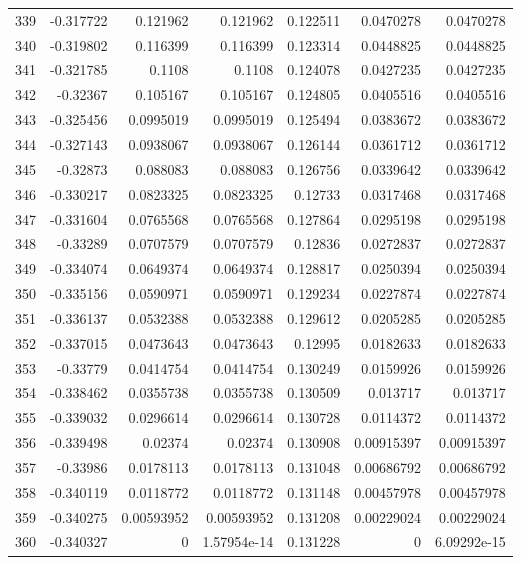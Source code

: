 \begin{tabular}{rrrrrrr}
 339 & -0.317722    & 0.121962    & 0.121962    &  0.122511    & 0.0470278   & 0.0470278   \\
 340 & -0.319802    & 0.116399    & 0.116399    &  0.123314    & 0.0448825   & 0.0448825   \\
 341 & -0.321785    & 0.1108      & 0.1108      &  0.124078    & 0.0427235   & 0.0427235   \\
 342 & -0.32367     & 0.105167    & 0.105167    &  0.124805    & 0.0405516   & 0.0405516   \\
 343 & -0.325456    & 0.0995019   & 0.0995019   &  0.125494    & 0.0383672   & 0.0383672   \\
 344 & -0.327143    & 0.0938067   & 0.0938067   &  0.126144    & 0.0361712   & 0.0361712   \\
 345 & -0.32873     & 0.088083    & 0.088083    &  0.126756    & 0.0339642   & 0.0339642   \\
 346 & -0.330217    & 0.0823325   & 0.0823325   &  0.12733     & 0.0317468   & 0.0317468   \\
 347 & -0.331604    & 0.0765568   & 0.0765568   &  0.127864    & 0.0295198   & 0.0295198   \\
 348 & -0.33289     & 0.0707579   & 0.0707579   &  0.12836     & 0.0272837   & 0.0272837   \\
 349 & -0.334074    & 0.0649374   & 0.0649374   &  0.128817    & 0.0250394   & 0.0250394   \\
 350 & -0.335156    & 0.0590971   & 0.0590971   &  0.129234    & 0.0227874   & 0.0227874   \\
 351 & -0.336137    & 0.0532388   & 0.0532388   &  0.129612    & 0.0205285   & 0.0205285   \\
 352 & -0.337015    & 0.0473643   & 0.0473643   &  0.12995     & 0.0182633   & 0.0182633   \\
 353 & -0.33779     & 0.0414754   & 0.0414754   &  0.130249    & 0.0159926   & 0.0159926   \\
 354 & -0.338462    & 0.0355738   & 0.0355738   &  0.130509    & 0.013717    & 0.013717    \\
 355 & -0.339032    & 0.0296614   & 0.0296614   &  0.130728    & 0.0114372   & 0.0114372   \\
 356 & -0.339498    & 0.02374     & 0.02374     &  0.130908    & 0.00915397  & 0.00915397  \\
 357 & -0.33986     & 0.0178113   & 0.0178113   &  0.131048    & 0.00686792  & 0.00686792  \\
 358 & -0.340119    & 0.0118772   & 0.0118772   &  0.131148    & 0.00457978  & 0.00457978  \\
 359 & -0.340275    & 0.00593952  & 0.00593952  &  0.131208    & 0.00229024  & 0.00229024  \\
 360 & -0.340327    & 0           & 1.57954e-14 &  0.131228    & 0           & 6.09292e-15 \\
\hline
\end{tabular}